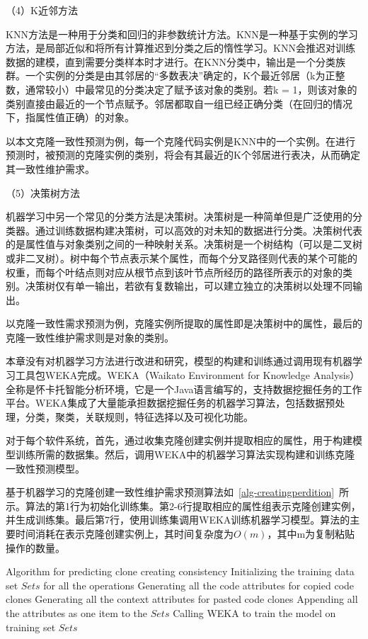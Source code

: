 （4）K近邻方法

KNN方法是一种用于分类和回归的非参数统计方法。KNN是一种基于实例的学习方法，是局部近似和将所有计算推迟到分类之后的惰性学习。KNN会推迟对训练数据的建模，直到需要分类样本时才进行。在KNN分类中，输出是一个分类族群。一个实例的分类是由其邻居的“多数表决”确定的，K个最近邻居（k为正整数，通常较小）中最常见的分类决定了赋予该对象的类别。若k = 1，则该对象的类别直接由最近的一个节点赋予。邻居都取自一组已经正确分类（在回归的情况下，指属性值正确）的对象。

以本文克隆一致性预测为例，每一个克隆代码实例是KNN中的一个实例。在进行预测时，被预测的克隆实例的类别，将会有其最近的K个邻居进行表决，从而确定其一致性维护需求。

（5）决策树方法

机器学习中另一个常见的分类方法是决策树。决策树是一种简单但是广泛使用的分类器。通过训练数据构建决策树，可以高效的对未知的数据进行分类。决策树代表的是属性值与对象类别之间的一种映射关系。决策树是一个树结构（可以是二叉树或非二叉树）。树中每个节点表示某个属性，而每个分叉路径则代表的某个可能的权重，而每个叶结点则对应从根节点到该叶节点所经历的路径所表示的对象的类别。决策树仅有单一输出，若欲有复数输出，可以建立独立的决策树以处理不同输出。

以克隆一致性需求预测为例，克隆实例所提取的属性即是决策树中的属性，最后的克隆一致性维护需求则是对象的类别。

本章没有对机器学习方法进行改进和研究，模型的构建和训练通过调用现有机器学习工具包WEKA完成。WEKA（Waikato Environment for Knowledge Analysis）全称是怀卡托智能分析环境，它是一个Java语言编写的，支持数据挖掘任务的工作平台。WEKA集成了大量能承担数据挖掘任务的机器学习算法，包括数据预处理，分类，聚类，关联规则，特征选择以及可视化功能。

对于每个软件系统，首先，通过收集克隆创建实例并提取相应的属性，用于构建模型训练所需的数据集。然后，调用WEKA中的机器学习算法实现构建和训练克隆一致性预测模型。

基于机器学习的克隆创建一致性维护需求预测算法如~\ref{alg-creatingperdition}~所示。算法的第1行为初始化训练集。第2-6行提取相应的属性组表示克隆创建实例，并生成训练集。最后第7行，使用训练集调用WEKA训练机器学习模型。算法的主要时间消耗在表示克隆创建实例上，其时间复杂度为$O(m)$，其中m为复制粘贴操作的数量。

\begin{minipage}{0.8\textwidth}
\centering
\begin{algorithm}[H]
 {Algorithm for predicting clone creating consistency}
\label{alg-creatingperdition}
Initializing the training data set $Sets$ for all the operations\; 
{ 
Generating all the code attributes for copied code clones\;
Generating all the context attributes for pasted code clones\;
Appending all the attributes as one item to the $Sets$\;
}
Calling WEKA to train the model on training set $Sets$\;
\end{algorithm}
\end{minipage}

